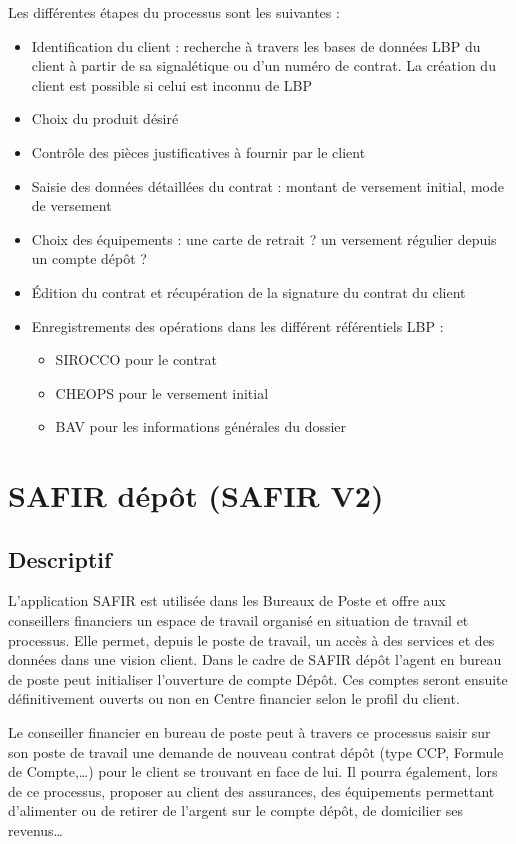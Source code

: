 Les différentes étapes du processus sont les suivantes :\\
\begin{itemize}
\item Identification du client : recherche à travers les bases de données LBP du client à partir de sa signalétique ou d’un numéro de contrat. La création du client est possible si celui est inconnu de LBP
\item Choix du produit désiré
\item Contrôle des pièces justificatives à fournir par le client
\item Saisie des données détaillées du contrat : montant de versement initial, mode de versement
\item Choix des équipements : une carte de retrait ? un versement régulier depuis un compte dépôt ?
\item Édition du contrat et récupération de la signature du contrat du client
\item Enregistrements des opérations dans les différent référentiels LBP : \begin{itemize}
												   \item SIROCCO pour le contrat
												   \item CHEOPS pour le versement initial
												   \item BAV pour les informations générales du dossier
												   \end{itemize}

\end{itemize}

\section{SAFIR dépôt (SAFIR V2)}

\subsection{Descriptif}
L'application SAFIR est utilisée dans les Bureaux de Poste et offre aux conseillers financiers un espace de travail organisé en situation de travail et processus. Elle permet, depuis le poste de travail, un accès à des services et des données dans une vision client. Dans le cadre de SAFIR dépôt l'agent en bureau de poste peut initialiser l'ouverture de compte Dépôt. Ces comptes seront ensuite définitivement ouverts ou non en Centre financier selon le profil du client.

Le conseiller financier en bureau de poste peut à travers ce processus saisir sur son poste de travail une demande de nouveau contrat dépôt (type CCP, Formule de Compte,…) pour le client se trouvant en face de lui. 
Il pourra également, lors de ce processus, proposer au client des assurances, des équipements permettant d'alimenter ou de retirer de l'argent sur le compte dépôt, de domicilier ses revenus…


